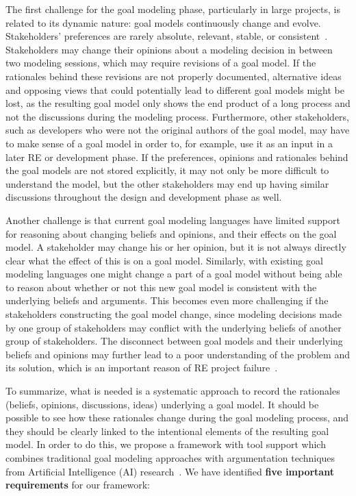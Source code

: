 The first challenge for the goal modeling phase, particularly in large projects, is related to its dynamic nature: goal models continuously change and evolve. Stakeholders' preferences are rarely absolute, relevant, stable, or consistent~\cite{march1978bounded}. Stakeholders may change their opinions about a modeling decision in between two modeling sessions, which may require revisions of a goal model. If the rationales behind these revisions are not properly documented, alternative ideas and opposing views that could potentially lead to different goal models might be lost, as the resulting goal model only shows the end product of a long process and not the discussions during the modeling process. Furthermore, other stakeholders, such as developers who were not the original authors of the goal model, may have to make sense of a goal model in order to, for example, use it as an input in a later RE or development phase. If the preferences, opinions and rationales behind the goal models are not stored explicitly, it may not only be more difficult to understand the model, but the other stakeholders may end up having similar discussions throughout the design and development phase as well.

Another challenge is that current goal modeling languages have limited support for reasoning about changing beliefs and opinions, and their effects on the goal model. A stakeholder may change his or her opinion, but it is not always directly clear what the effect of this is on a goal model. Similarly, with existing goal modeling languages one might change a part of a goal model without being able to reason about whether or not this new goal model is consistent with the underlying beliefs and arguments. This becomes even more challenging if the stakeholders constructing the goal model change, since modeling decisions made by one group of stakeholders may conflict with the underlying beliefs of another group of stakeholders. The disconnect between goal models and their underlying beliefs and opinions may further lead to a poor understanding of the problem and its solution, which is an important reason of RE project failure~\cite{curtis1988field}. 

To summarize, what is needed is a systematic approach to record the rationales (beliefs, opinions, discussions, ideas) underlying a goal model. It should be possible to see how these rationales change during the goal modeling process, and they  should be clearly linked to the intentional elements of the resulting goal model. In order to do this, we propose a framework with tool support which combines traditional goal modeling approaches with argumentation techniques from Artificial Intelligence (AI) research~\cite{BenchCaponDunne2007}. We have identified \textbf{five important requirements} for our framework: 

